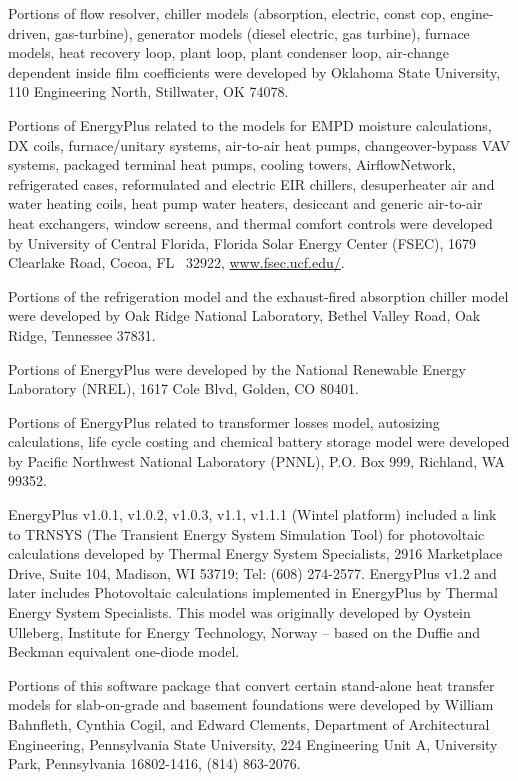 Portions of flow resolver, chiller models (absorption, electric, const cop, engine-driven, gas-turbine), generator models (diesel electric, gas turbine), furnace models, heat recovery loop, plant loop, plant condenser loop, air-change dependent inside film coefficients were developed by Oklahoma State University, 110 Engineering North, Stillwater, OK 74078.

Portions of EnergyPlus related to the models for EMPD moisture calculations, DX coils, furnace/unitary systems, air-to-air heat pumps, changeover-bypass VAV systems, packaged terminal heat pumps, cooling towers, AirflowNetwork, refrigerated cases, reformulated and electric EIR chillers, desuperheater air and water heating coils, heat pump water heaters, desiccant and generic air-to-air heat exchangers, window screens, and thermal comfort controls were developed by University of Central Florida, Florida Solar Energy Center (FSEC), 1679 Clearlake Road, Cocoa, FL~ 32922, \href{http://www.fsec.ucf.edu/}{www.fsec.ucf.edu/}.

Portions of the refrigeration model and the exhaust-fired absorption chiller model were developed by Oak Ridge National Laboratory, Bethel Valley Road, Oak Ridge, Tennessee 37831.

Portions of EnergyPlus were developed by the National Renewable Energy Laboratory (NREL), 1617 Cole Blvd, Golden, CO 80401.

Portions of EnergyPlus related to transformer losses model, autosizing calculations, life cycle costing and chemical battery storage model were developed by Pacific Northwest National Laboratory (PNNL), P.O. Box 999, Richland, WA 99352.

EnergyPlus v1.0.1, v1.0.2, v1.0.3, v1.1, v1.1.1 (Wintel platform) included a link to TRNSYS (The Transient Energy System Simulation Tool) for photovoltaic calculations developed by Thermal Energy System Specialists, 2916 Marketplace Drive, Suite 104, Madison, WI 53719; Tel: (608) 274-2577. EnergyPlus v1.2 and later includes Photovoltaic calculations implemented in EnergyPlus by Thermal Energy System Specialists. This model was originally developed by Oystein Ulleberg, Institute for Energy Technology, Norway -- based on the Duffie and Beckman equivalent one-diode model.

Portions of this software package that convert certain stand-alone heat transfer models for slab-on-grade and basement foundations were developed by William Bahnfleth, Cynthia Cogil, and Edward Clements, Department of Architectural Engineering, Pennsylvania State University, 224 Engineering Unit A, University Park, Pennsylvania 16802-1416, (814) 863-2076.

